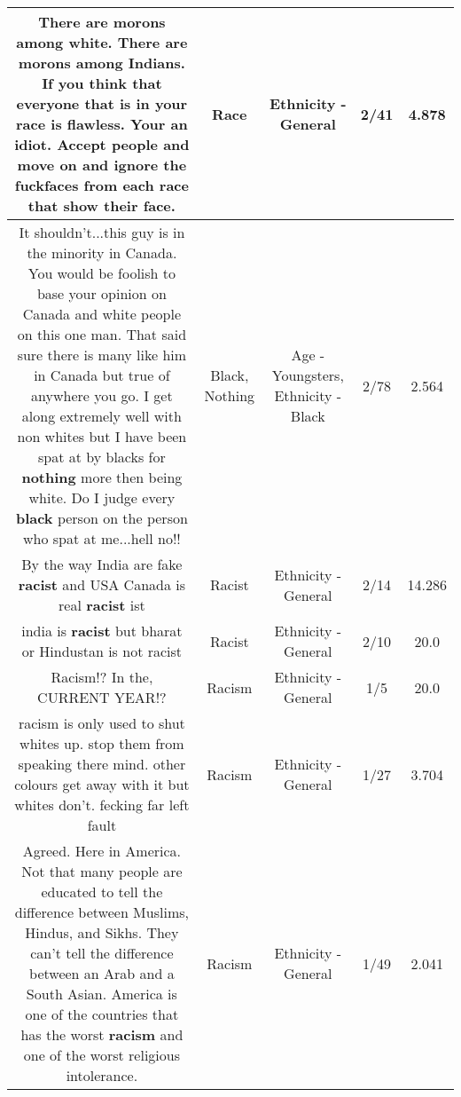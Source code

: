 \documentclass[11pt]{article}
\newlength\mylength
\begin{document}
\begin{center}
\begin{longtable}{|C{.65\mylength}|C{.30\mylength}|C{.12\mylength}|C{.12\mylength}|C{.12\mylength}|}
  \small There are morons among white. There are morons among Indians. If you think that everyone that is in your \textbf{race} is flawless. Your an idiot. Accept people and move on and ignore the fuckfaces from each \textbf{race} that show their face.\normalsize   & Race & Ethnicity - General & 2/41 & 4.878 \\  \hline
  \small It shouldn't...this guy is in the minority in Canada. You would be foolish to base your opinion on Canada and white people on this one man. That said sure there is many like him in Canada but true of anywhere you go. I get along extremely well with non whites but I have been spat at by blacks for \textbf{nothing} more then being white. Do I judge every \textbf{black} person on the person who spat at me...hell no!!\normalsize   & Black, Nothing & Age - Youngsters, Ethnicity - Black & 2/78 & 2.564 \\  \hline
  \small By the way India are fake \textbf{racist} and USA Canada is real \textbf{racist} ist\normalsize   & Racist & Ethnicity - General & 2/14 & 14.286 \\  \hline
  \small india is \textbf{racist} but bharat or Hindustan is not racist\normalsize   & Racist & Ethnicity - General & 2/10 & 20.0 \\  \hline
  \small Racism!? In the, CURRENT YEAR!?\normalsize   & Racism & Ethnicity - General & 1/5 & 20.0 \\  \hline
  \small racism is only used to shut whites up. stop them from speaking there mind. other colours get away with it but whites don't. fecking far left fault\normalsize   & Racism & Ethnicity - General & 1/27 & 3.704 \\  \hline
  \small Agreed. Here in America. Not that many people are educated to tell the difference between Muslims, Hindus, and Sikhs. They can't tell the difference between an Arab and a South Asian. America is one of the countries that has the worst \textbf{racism} and one of the worst religious intolerance.\normalsize   & Racism & Ethnicity - General & 1/49 & 2.041 \\  \hline

\end{longtable}
\end{center}
\end{document}
